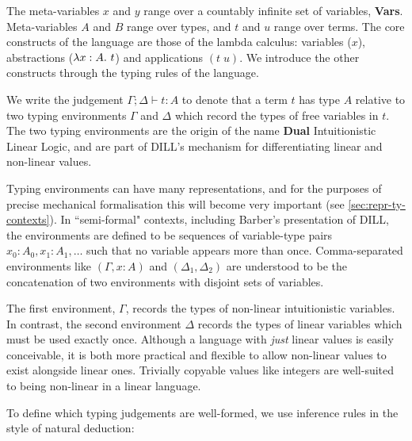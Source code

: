 \documentclass[]{unswthesis}
\newcommand{\lam}[1]{\lambda #1 \ldotp \,}
\newcommand{\app}[2]{(#1 \; #2)}
\newcommand{\types}{\vdash}
\let\i\textit
\let\b\textbf
\begin{document}
The meta-variables $x$ and $y$ range over a countably infinite set of variables, \b{Vars}. Meta-variables $A$ and $B$ range over types, and $t$ and $u$ range over terms. The core constructs of the language are those of the lambda calculus: variables ($x$), abstractions ($\lam{x : A} t$) and applications $\app{t}{u}$. We introduce the other constructs through the typing rules of the language.

We write the judgement $\Gamma; \Delta \types t : A$ to denote that a term $t$ has type $A$ relative to two typing environments $\Gamma$ and $\Delta$ which record the types of free variables in $t$. The two typing environments are the origin of the name \b{Dual} Intuitionistic Linear Logic, and are part of DILL's mechanism for differentiating linear and non-linear values.

Typing environments can have many representations, and for the purposes of precise mechanical formalisation this will become very important (see \cref{sec:repr-ty-contexts}). In ``semi-formal" contexts, including Barber's presentation of DILL, the environments are defined to be sequences of variable-type pairs $x_0 : A_0, x_1 : A_1, \dots$ such that no variable appears more than once. Comma-separated environments like $(\Gamma, x : A)$ and $(\Delta_1, \Delta_2)$ are understood to be the concatenation of two environments with disjoint sets of variables.

The first environment, $\Gamma$, records the types of non-linear intuitionistic variables. In contrast, the second environment $\Delta$ records the types of linear variables which must be used exactly once. Although a language with \i{just} linear values is easily conceivable, it is both more practical and flexible to allow non-linear values to exist alongside linear ones. Trivially copyable values like integers are well-suited to being non-linear in a linear language.

To define which typing judgements are well-formed, we use inference rules in the style of natural deduction:


\end{document}
